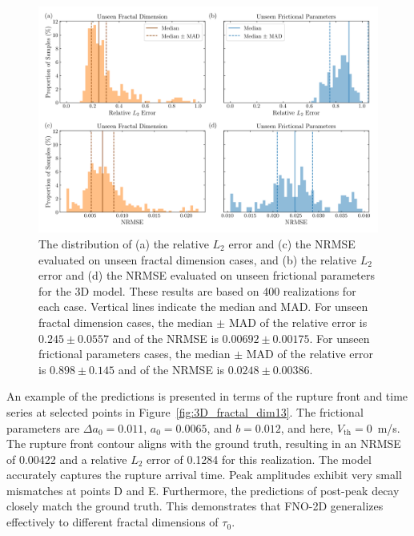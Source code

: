 \documentclass[draft]{agujournal2019}
\begin{document}
\begin{figure}
\centering
\includegraphics[width=1.0\linewidth]{3D_hist_unseen_2.png}
\caption{\label{fig:3D_hist_unseen}The distribution of (a) the relative \(L_2\) error and (c) the NRMSE evaluated on unseen fractal dimension cases, and (b) the relative \(L_2\) error and (d) the NRMSE evaluated on unseen frictional parameters for the 3D model. These results are based on 400 realizations for each case. Vertical lines indicate the median and MAD. For unseen fractal dimension cases, the median \(\pm\) MAD of the relative error is \(0.245 \pm 0.0557\) and of the NRMSE is \(0.00692 \pm 0.00175\). For unseen frictional parameters cases, the median \(\pm\) MAD of the relative error is \(0.898 \pm 0.145\) and of the NRMSE is \(0.0248 \pm 0.00386\).
}
\end{figure}


An example of the predictions is presented in terms of the rupture front and time series at selected points in Figure~\ref{fig:3D_fractal_dim13}. The frictional parameters are \(\Delta a_{0} = 0.011\), \(a_{0} = 0.0065\), and \(b = 0.012\), and here, \(V_\text{th} = 0\)~m/s. The rupture front contour aligns with the ground truth, resulting in an NRMSE of 0.00422 and a relative \(L_2\) error of 0.1284 for this realization. The model accurately captures the rupture arrival time. Peak amplitudes exhibit very small mismatches at points D and E. Furthermore, the predictions of post-peak decay closely match the ground truth. This demonstrates that FNO-2D generalizes effectively to different fractal dimensions of \(\tau_{0}\).
\end{document}
